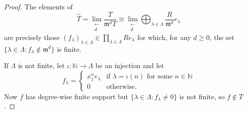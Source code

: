 \documentclass[10pt,a4paper]{amsart}
\def\fm{{\mathfrak{m}}}
\begin{document}
\begin{proof}
The elements of
\[
\widehat{T}=\lim_{\substack{\longleftarrow\\d}}\frac{ T}{\fm^d T}\cong
\lim_{\substack{\longleftarrow\\d}} \bigoplus_{\lambda\in\Lambda} \frac{R}{\fm^d} e_\lambda
\]
are precisely those $(f_\lambda)_{\lambda\in\Lambda}\in \prod_{\lambda\in\Lambda} R e_\lambda$ %
for which, for any $d\geq 0$,
the set $\{ \lambda\in \Lambda : f_\lambda\notin \fm^d \}$ is finite.

If $\Lambda$ is not finite, let $\iota: \mathbb{N} \to \Lambda$ be an injection
and let
\[
f_\lambda=
\left\{
\begin{array}{ll}
x_1^n e_\lambda & \text{if } \lambda=\iota(n) \text{ for some } n\in\mathbb{N}\\
0 & \text{otherwise}.
\end{array}
\right.
\]
Now $f$ has degree-wise finite support but $\{ \lambda\in \Lambda : f_\lambda\neq 0\}$ is not finite, so $f\notin T$.
\end{proof}
\end{document}
